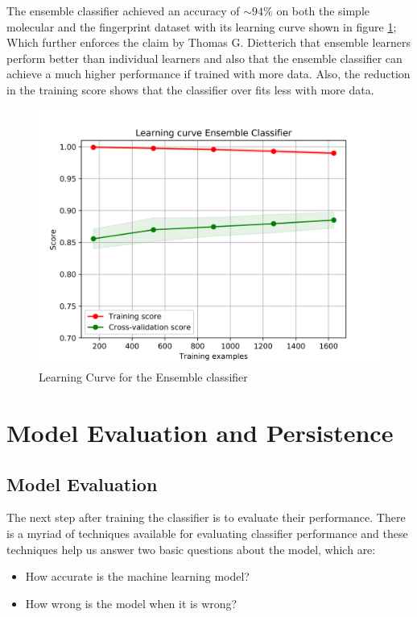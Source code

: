 \documentclass[a4paper,12pt]{report}
\begin{document}
		The ensemble classifier achieved an accuracy of $\sim94\%$ on both the simple molecular and the fingerprint dataset with its learning curve shown in figure \ref{fig:learning_curve_ensemble}; Which further enforces the claim by Thomas G. Dietterich \cite{Dietterich} that ensemble learners perform better than individual learners and also that the ensemble classifier can achieve a much higher performance if trained with more data. Also, the reduction in the training score shows that the classifier over fits less with more data.
			\begin{figure}[H]
				\centering
				\includegraphics[width=\textwidth,scale=1]{images/learning_curve_ensemble_clf}
				\caption{Learning Curve for the Ensemble classifier}
				\label{fig:learning_curve_ensemble}
			\end{figure}
		
		

\chapter{Model Evaluation and Persistence}
	\section{Model Evaluation}
		The next step after training the classifier is to evaluate their performance. There is a myriad of techniques available for evaluating classifier performance and these techniques help us answer two basic questions about the model, which are:
			\begin{itemize}
				\item How accurate is the machine learning model?
				\item How wrong is the model when it is wrong?
			\end{itemize}
			
\end{document}
